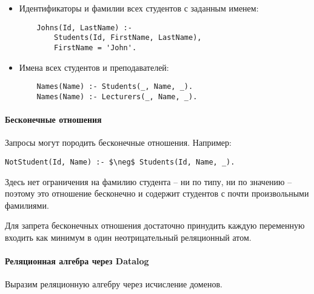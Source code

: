 \begin{itemize}
	\item Идентификаторы и фамилии всех студентов с заданным именем:
	      \begin{lstlisting}
    Johns(Id, LastName) :-
        Students(Id, FirstName, LastName),
        FirstName = 'John'.
        \end{lstlisting}
	\item Имена всех студентов и преподавателей:
	      \begin{lstlisting}
    Names(Name) :- Students(_, Name, _).
    Names(Name) :- Lecturers(_, Name, _).
        \end{lstlisting}
\end{itemize}

\paragraph{Бесконечные отношения}

Запросы могут породить бесконечные отношения. Например:

\begin{lstlisting}[mathescape=true]
    NotStudent(Id, Name) :- $\neg$ Students(Id, Name, _).
\end{lstlisting}

Здесь нет ограничения на фамилию студента -- ни по типу, ни по значению -- поэтому это отношение
бесконечно и содержит студентов с почти произвольными фамилиями.

\begin{proposition}
	Для запрета бесконечных отношения достаточно принудить каждую переменную входить как минимум в один
	неотрицательный реляционный атом.
\end{proposition}

\paragraph{Реляционная алгебра через Datalog}

Выразим реляционную алгебру через исчисление доменов.

